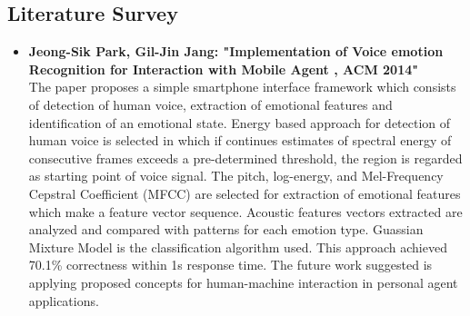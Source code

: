 \documentclass[oneside,a4paper,12pt]{report}
\begin{document}
\begin{normalsize}
\section{Literature Survey}
\begin{itemize}
	\item \textbf{Jeong-Sik Park,  Gil-Jin Jang:  "Implementation of Voice emotion Recognition for Interaction with Mobile Agent , ACM 2014"} \cite{park15_implem_voice_emotion_recog_inter} \\
	The paper proposes a simple smartphone interface framework which consists of detection of human voice, extraction of emotional features and identification of an emotional state. Energy based approach for detection of human voice is selected in which if continues estimates of spectral energy of consecutive frames exceeds a pre-determined threshold, the region is regarded as starting point of voice signal. The pitch, log-energy, and Mel-Frequency Cepstral Coefficient (MFCC) are selected for extraction of emotional features which make a feature vector sequence. Acoustic features vectors extracted are analyzed and compared with patterns for each emotion type. Guassian Mixture Model is the classification algorithm used. This approach achieved 70.1\% correctness within 1s response time. The future work suggested is applying proposed concepts for human-machine interaction in personal agent applications.
	

\end{itemize}
\end{normalsize}
\end{document}
